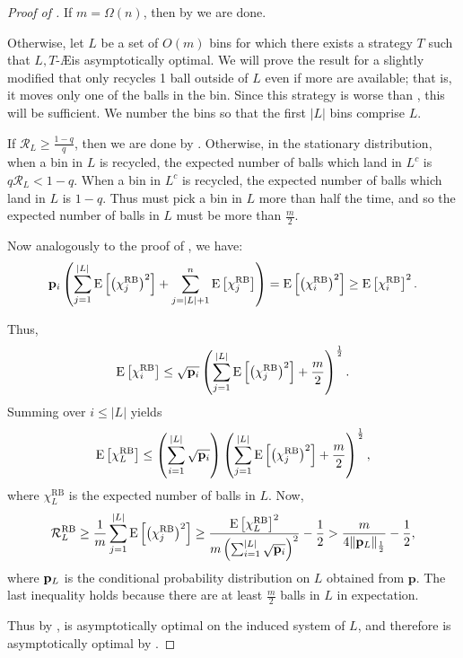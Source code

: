 \begin{proof}[Proof of ]
	If $m=\Omega(n)$, then by  we are done.

	Otherwise, let $L$ be a set of $O(m)$ bins for which there exists a
	strategy $T$ such that $L,T$-\AE is asymptotically optimal. We will prove
	the result for a slightly modified \RB that only recycles 1 ball outside of
	$L$ even if more are available; that is, it moves only one of the balls in
	the bin. Since this strategy is worse than \RB, this will be sufficient. We
	number the bins so that the first $|L|$ bins comprise $L$.
	
	If $\mathcal{R}_L \geq \frac{1-q}{q}$, then we are done by
	. Otherwise, in the stationary distribution, when a
	bin in $L$ is recycled, the expected number of balls which land in $L^c$ is
	$q\mathcal{R}_L < 1-q$. When a bin in $L^c$ is recycled, the expected
	number of balls which land in $L$ is $1-q$. Thus \RB must pick a bin in $L$
	more than half the time, and so the expected number of balls in $L$ must be
	more than $\frac{m}{2}$.

	Now analogously to the proof of , we have:
        \[ \mathbf{p}_i\left(\sum_{j=1}^{|L|} \mathrm{E}\left[\left(\chi_j^\mathrm{RB}\right)^2\right] + \sum_{j=|L|+1}^n \mathrm{E}\left[\chi_j^\mathrm{RB}\right]\right) = \mathrm{E}\left[\left(\chi_i^\mathrm{RB}\right)^2\right] \geq \mathrm{E}\left[\chi_i^\mathrm{RB}\right]^2.\]

	Thus,
	\[ \mathrm{E}\left[\chi_i^\mathrm{RB}\right] \leq \sqrt{\mathbf{p}_i}\left(\sum_{j=1}^{|L|} \mathrm{E}\left[\left(\chi_j^\mathrm{RB}\right)^2\right] + \frac{m}{2}\right)^{\frac{1}{2}}.\]
	Summing over $i \leq |L|$ yields
	\[ \mathrm{E}\left[\chi_L^\mathrm{RB}\right] \leq \left(\sum_{i=1}^{|L|} \sqrt{\mathbf{p}_i}\right)\left(\sum_{j=1}^{|L|} \mathrm{E}\left[\left(\chi_j^\mathrm{RB}\right)^2\right] + \frac{m}{2}\right)^\frac{1}{2}, \]
	where $\chi_L^\mathrm{RB}$ is the expected number of balls in $L$. Now,
        \[ \mathcal{R}_L^\mathrm{RB} \geq \frac{1}{m}\sum_{j=1}^{|L|} \mathrm{E}\left[\left(\chi_j^\mathrm{RB}\right)^2\right] \geq \frac{\mathrm{E}\left[\chi_L^\mathrm{RB}\right]^2}{m\left(\sum_{i=1}^{|L|} \sqrt{\mathbf{p}_i}\right)^2} - \frac{1}{2} > \frac{m}{4\|\mathbf{p}_L\|_{\frac{1}{2}}} - \frac{1}{2}, \]
	where $\mathbf{p}_L$ is the conditional probability distribution on $L$ obtained
	from $\mathbf{p}$. The last inequality holds because there are at least
	$\frac{m}{2}$ balls in $L$ in expectation.

	Thus by , \RB is asymptotically optimal on the induced
	system of $L$, and therefore \RB is asymptotically optimal by
	.
\end{proof}
